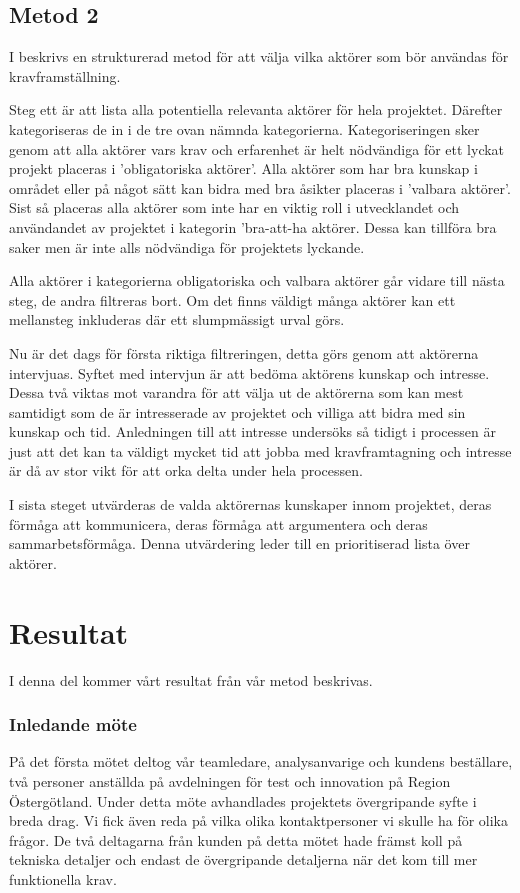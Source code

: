 \subsection{Metod 2}
I \cite{cs_structured} beskrivs en strukturerad metod för att välja vilka aktörer som bör användas för kravframställning. 

Steg ett är att lista alla potentiella relevanta aktörer för hela projektet.
Därefter kategoriseras de in i de tre ovan nämnda kategorierna. Kategoriseringen sker genom att alla aktörer vars krav och erfarenhet är helt nödvändiga för ett lyckat projekt placeras i 'obligatoriska aktörer'. Alla aktörer som har bra kunskap i området eller på något sätt kan bidra med bra åsikter placeras i 'valbara aktörer'. Sist så placeras alla aktörer som inte har en viktig roll i utvecklandet och användandet av projektet i kategorin 'bra-att-ha aktörer. Dessa kan tillföra bra saker men är inte alls nödvändiga för projektets lyckande. 

Alla aktörer i kategorierna obligatoriska och valbara aktörer går vidare till nästa steg, de andra filtreras bort. Om det finns väldigt många aktörer kan ett mellansteg inkluderas där ett slumpmässigt urval görs.

Nu är det dags för första riktiga filtreringen, detta görs genom att aktörerna intervjuas. Syftet med intervjun är att bedöma aktörens kunskap och intresse. Dessa två viktas mot varandra för att välja ut de aktörerna som kan mest samtidigt som de är intresserade av projektet och villiga att bidra med sin kunskap och tid. Anledningen till att intresse undersöks så tidigt i processen är just att det kan ta väldigt mycket tid att jobba med kravframtagning och intresse är då av stor vikt för att orka delta under hela processen. 

I sista steget utvärderas de valda aktörernas kunskaper innom projektet, deras förmåga att kommunicera, deras förmåga att argumentera och deras sammarbetsförmåga. Denna utvärdering leder till en prioritiserad lista över aktörer.

\section{Resultat}
I denna del kommer vårt resultat från vår metod beskrivas.

\subsubsection{Inledande möte}
På det första mötet deltog vår teamledare, analysanvarige och kundens beställare, två personer anställda på avdelningen för test och innovation på Region Östergötland. Under detta möte avhandlades projektets övergripande syfte i breda drag.
Vi fick även reda på vilka olika kontaktpersoner vi skulle ha för olika frågor. De två deltagarna från kunden på detta mötet hade främst koll på tekniska detaljer och endast de övergripande detaljerna när det kom till mer funktionella krav.

